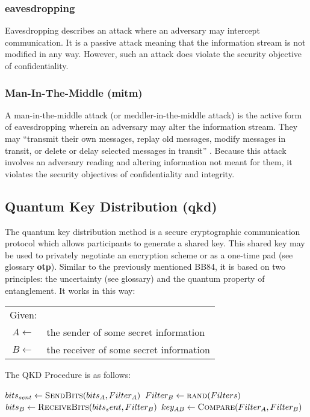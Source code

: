     \subsubsection{\textbf{\Gls{eavesdropping}}}
    Eavesdropping describes an attack where an adversary may intercept communication. It is a passive attack meaning that the information stream is not modified in any way. However, such an attack does violate the security objective of confidentiality.
    
    \subsubsection{Man-In-The-Middle (\textbf{\gls{mitm}})}
    A man-in-the-middle attack (or meddler-in-the-middle attack) is the active form of eavesdropping wherein an adversary may alter the information stream. They may ``transmit their own messages, replay old messages, modify messages in transit, or delete or delay selected messages in transit'' \cite{netsec}. Because this attack involves an adversary reading and altering information not meant for them, it violates the security objectives of confidentiality and integrity.

    \subsection{Quantum Key Distribution (\textbf{\gls{qkd}})}
    The quantum key distribution method is a secure cryptographic communication protocol which allows participants to generate a shared key. This shared key may be used to privately negotiate an encryption scheme or as a one-time pad (see glossary \textbf{\gls{otp}}). Similar to the previously mentioned BB84, it is based on two principles: the \gls{uncertainty} (see glossary) and the quantum property of entanglement. It works in this way:
    
    \begin{table}[h!]
        \begin{tabular}{cl}{Given:} \\
             $A \leftarrow $ & the sender of some secret information\\
             $B \leftarrow $ & the receiver of some secret information \\
        \end{tabular}
        \label{tab:given_vars}
    \end{table}

    \begin{algorithm}
        \caption{The QKD Procedure is as follows:}
        \label{alg:qkd}
        \begin{algorithmic}[1]
                \State $bits_{sent} \gets \Call{SendBits}{bits_A, Filter_A}$
                \State $Filter_B \gets \Call{rand}{Filters}$
                \State $bits_B \gets \Call{ReceiveBits}{bits_sent, Filter_B}$
                \State $key_{AB} \gets \Call{Compare}{Filter_A, Filter_B}$ \label{compare}
            \EndProcedure
        \end{algorithmic}
    \end{algorithm}

